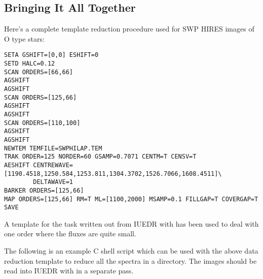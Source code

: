 \subsection{Bringing It All Together}

Here's a complete template reduction procedure used for SWP HIRES images of
O type stars:

\begin{verbatim}
SETA GSHIFT=[0,0] ESHIFT=0
SETD HALC=0.12
SCAN ORDERS=[66,66]
AGSHIFT
AGSHIFT
SCAN ORDERS=[125,66]
AGSHIFT
AGSHIFT
SCAN ORDERS=[110,100]
AGSHIFT
AGSHIFT
NEWTEM TEMFILE=SWPHILAP.TEM
TRAK ORDER=125 NORDER=60 GSAMP=0.7071 CENTM=T CENSV=T
AESHIFT CENTREWAVE=[1190.4518,1250.584,1253.811,1304.3702,1526.7066,1608.4511]\
        DELTAWAVE=1
BARKER ORDERS=[125,66]
MAP ORDERS=[125,66] RM=T ML=[1100,2000] MSAMP=0.1 FILLGAP=T COVERGAP=T
SAVE
\end{verbatim}

A template for the 
task written out from IUEDR with 
has been used to deal with one order where the fluxes are quite small.

The following is an example C shell script which can be used with the above
data reduction template to reduce all the spectra in a directory.  The images
should be read into IUEDR with \xref{\verb+READIUE+}{sg3}{READIUE}
 in a separate pass.

